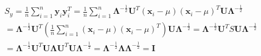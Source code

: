\documentclass[12pt]{article}
\begin{document}
\begin{qsolve}
    \begin{gather*}
        S_{y} = \frac{1}{n} \sum_{i=1}^{n} \mathbf{y}_{i} \mathbf{y}_{i}^T = \frac{1}{n} \sum_{i=1}^{n} \mathbf{\Lambda}^{-\frac{1}{2}} \mathbf{U}^T (\mathbf{x}_{i} - \mu) (\mathbf{x}_{i} - \mu)^T \mathbf{U} \mathbf{\Lambda}^{-\frac{1}{2}} \\
        = \mathbf{\Lambda}^{-\frac{1}{2}} \mathbf{U}^T (\frac{1}{n} \sum_{i=1}^{n} (\mathbf{x}_{i} - \mu) (\mathbf{x}_{i} - \mu)^T) \mathbf{U} \mathbf{\Lambda}^{-\frac{1}{2}} = \mathbf{\Lambda}^{-\frac{1}{2}} \mathbf{U}^T S \mathbf{U} \mathbf{\Lambda}^{-\frac{1}{2}} \\
        = \mathbf{\Lambda}^{-\frac{1}{2}} \mathbf{U}^T \mathbf{U} \mathbf{\Lambda} \mathbf{U}^T \mathbf{U} \mathbf{\Lambda}^{-\frac{1}{2}} = \mathbf{\Lambda}^{-\frac{1}{2}} \mathbf{\Lambda} \mathbf{\Lambda}^{-\frac{1}{2}} = \mathbf{I} \\
    \end{gather*}
\end{qsolve}
\end{document}

